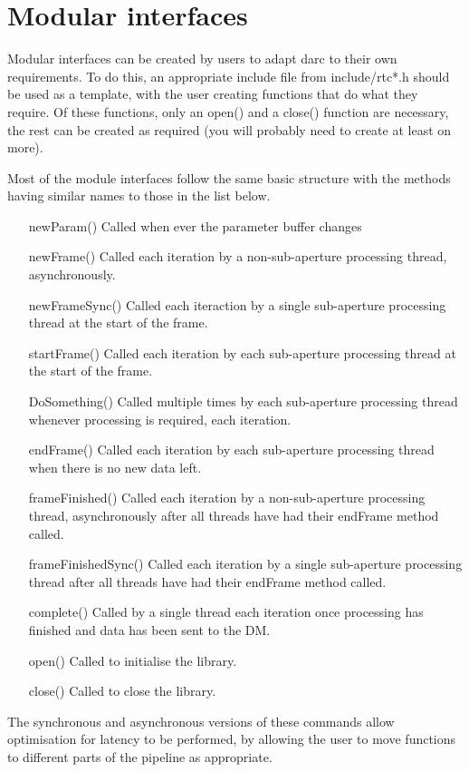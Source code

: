 \documentclass[a4,10pt]{article}
\begin{document}
\section{Modular interfaces}
Modular interfaces can be created by users to adapt darc to their own
requirements.  To do this, an appropriate include file from
include/rtc*.h should be used as a template, with the user creating
functions that do what they require.  Of these functions, only an
open() and a close() function are necessary, the rest can be created
as required (you will probably need to create at least on more).

Most of the module interfaces follow the same basic structure with the
methods having similar names to those in the list below.

\begin{itemize}
\item[newParam()] Called when ever the parameter buffer changes
\item[newFrame()] Called each iteration by a non-sub-aperture processing thread,
  asynchronously.
\item[newFrameSync()] Called each iteraction by a single sub-aperture
  processing thread at the start of the frame.
\item[startFrame()] Called each iteration by each sub-aperture
  processing thread at the start of the frame.
\item[DoSomething()] Called multiple times by each sub-aperture
  processing thread whenever processing is required, each iteration.
\item[endFrame()] Called each iteration by each sub-aperture
  processing thread when there is no new data left.
\item[frameFinished()] Called each iteration by a non-sub-aperture
  processing thread, asynchronously after all threads have had their
  endFrame method called.
\item[frameFinishedSync()] Called each iteration by a single sub-aperture
  processing thread after all threads have had their endFrame method
  called.
\item[complete()] Called by a single thread each iteration once
  processing has finished and data has been sent to the DM.
\item[open()] Called to initialise the library.
\item[close()] Called to close the library.
\end{itemize}

The synchronous and asynchronous versions of these commands allow
optimisation for latency to be performed, by allowing the user to move
functions to different parts of the pipeline as appropriate.
\end{document}
